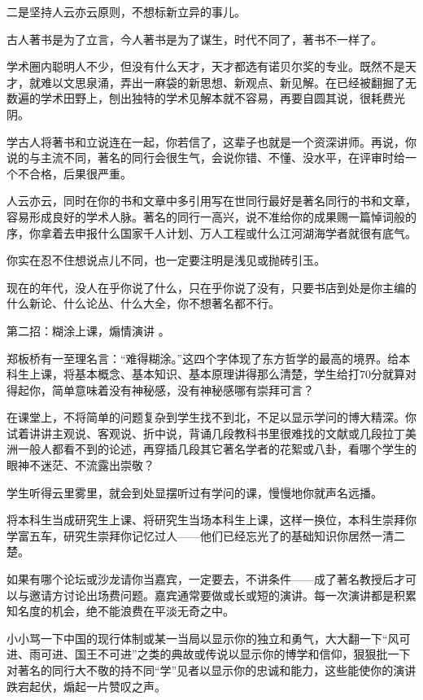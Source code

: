 二是坚持人云亦云原则，不想标新立异的事儿。

古人著书是为了立言，今人著书是为了谋生，时代不同了，著书不一样了。

学术圈内聪明人不少，但没有什么天才，天才都选有诺贝尔奖的专业。既然不是天才，就难以文思泉涌，弄出一麻袋的新思想、新观点、新见解。在已经被翻掘了无数遍的学术田野上，刨出独特的学术见解本就不容易，再要自圆其说，很耗费光阴。

学古人将著书和立说连在一起，你若信了，这辈子也就是一个资深讲师。再说，你说的与主流不同，著名的同行会很生气，会说你错、不懂、没水平，在评审时给一个不合格，后果很严重。

人云亦云，同时在你的书和文章中多引用写在世同行最好是著名同行的书和文章，容易形成良好的学术人脉。著名的同行一高兴，说不准给你的成果赐一篇悼词般的序，你拿着去申报什么国家千人计划、万人工程或什么江河湖海学者就很有底气。

你实在忍不住想说点儿不同，也一定要注明是浅见或抛砖引玉。


现在的年代，没人在乎你说了什么，只在乎你说了没有，只要书店到处是你主编的什么新论、什么论丛、什么大全，你不想著名都不行。

第二招：糊涂上课，煽情演讲 。     

郑板桥有一至理名言：“难得糊涂。”这四个字体现了东方哲学的最高的境界。给本科生上课，将基本概念、基本知识、基本原理讲得那么清楚，学生给打70分就算对得起你，简单意味着没有神秘感，没有神秘感哪有崇拜可言？

在课堂上，不将简单的问题复杂到学生找不到北，不足以显示学问的博大精深。你试着讲讲主观说、客观说、折中说，背诵几段教科书里很难找的文献或几段拉丁美洲一般人都看不到的论述，再穿插几段其它著名学者的花絮或八卦，看哪个学生的眼神不迷茫、不流露出崇敬？

学生听得云里雾里，就会到处显摆听过有学问的课，慢慢地你就声名远播。

将本科生当成研究生上课、将研究生当场本科生上课，这样一换位，本科生崇拜你学富五车，研究生崇拜你记忆过人——他们已经忘光了的基础知识你居然一清二楚。





如果有哪个论坛或沙龙请你当嘉宾，一定要去，不讲条件——成了著名教授后才可以与邀请方讨论出场费问题。嘉宾通常要做或长或短的演讲。每一次演讲都是积累知名度的机会，绝不能浪费在平淡无奇之中。

小小骂一下中国的现行体制或某一当局以显示你的独立和勇气，大大翻一下“风可进、雨可进、国王不可进”之类的典故或传说以显示你的博学和信仰，狠狠批一下对著名的同行大不敬的持不同“学”见者以显示你的忠诚和能力，这些能使你的演讲跌宕起伏，煽起一片赞叹之声。

